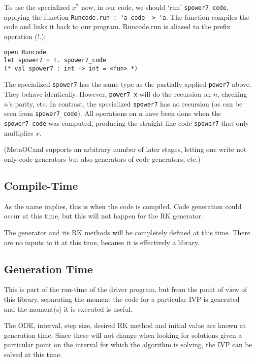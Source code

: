 \documentclass[12pt, titlepage]{article}
\begin{document}
To use the specialized $x^7$ now, in our code, we should `run' 
\lstinline|spower7_code|, applying the function 
\lstinline|Runcode.run : 'a code -> 'a|. The function compiles the code and 
links it back to our program. Runcode.run is aliased to the prefix operation 
(!.):
\begin{lstlisting}
open Runcode
let spower7 = !. spower7_code
(* val spower7 : int -> int = <fun> *)
\end{lstlisting}

The specialized \lstinline|spower7| has the same type as the partially applied 
\lstinline|power7| above. They behave identically. However, 
\lstinline|power7 x| will do the recursion on $n$, checking $n$'s parity, etc. 
In contrast, the specialized \lstinline|spower7| has no recursion (as can be 
seen from \lstinline|spower7_code|). All operations on n have been done when 
the \lstinline|spower7_code| was computed, producing the straight-line code 
\lstinline|spower7| that only multiplies $x$.

(MetaOCaml supports an arbitrary number of later stages, letting one write not 
only code generators but also generators of code generators, etc.)


\subsection{Compile-Time}
As the name implies, this is when the code is compiled. Code generation could 
occur at this time, but this will not happen for the RK generator.

The generator and its RK methods will be completely defined at this time. There 
are no inputs to it at this time, because it is effectively a library.

\subsection{Generation Time}
This is part of the run-time of the driver program, but from the point of view 
of this library, separating the moment the code for a particular IVP is 
generated and the moment(s) it is executed is useful.

The ODE, interval, step size, desired RK method and initial value are known at 
generation time. 
Since these will not change when looking for solutions given a particular point 
on the interval for which the algorithm is solving, the IVP can be solved at 
this time.
\end{document}
